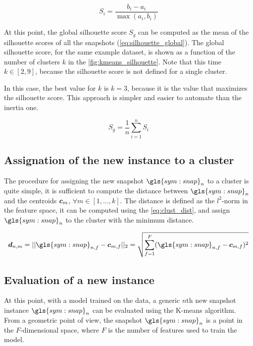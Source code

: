 \begin{equation}
  \label{eq:silhouette}
  S_i = \frac{b_i - a_i}{\max{(a_i,b_i)}}
\end{equation}

At this point, the global silhouette score $S_g$ can be computed as the mean of the silhouette scores of all the snapshots (\autoref{eq:silhouette_global}). The global silhouette score, for the same example dataset, is shown as a function of the number of clusters $k$ in the \autoref{fig:kmeans_silhouette}. Note that this time $k \in [2,9]$, because the silhouette score is not defined for a single cluster.

In this case, the best value for $k$ is $k=3$, because it is the value that maximizes the silhouette score. This approach is simpler and easier to automate than the inertia one. 

\begin{equation}
  \label{eq:silhouette_global}
  S_g = \frac{1}{n}\sum_{i=1}^{n} S_i
\end{equation}

\subsection{Assignation of the new instance to a cluster}
The procedure for assigning the new snapshot $\gls{sym:snap}_n$ to a cluster is quite simple, it is sufficient to compute the distance between $\gls{sym:snap}_n$ and the centroids $\bm{c}_m$, $\forall m \in  [1, \dots , k]$. The distance is defined as the $l^2$-norm in the feature space, it can be computed using the \autoref{eq:clust_dist}, and assign $\gls{sym:snap}_n$ to the cluster with the minimum distance.

\begin{equation}
  \label{eq:clust_dist}
  \vect{d}_{n,m} = ||\gls{sym:snap}_{n,f} - \vect{c}_{m,f}||_2 = \sqrt{\sum_{f=1}^{F} (\gls{sym:snap}_{n,f} - \vect{c}_{m,f})^2}
\end{equation}

\subsection{Evaluation of a new instance}

At this point, with a model trained on the data, a generic $n$th new snapshot instance $\gls{sym:snap}_n$ can be evaluated using the K-means algorithm.
From a geometric point of view, the snapshot $\gls{sym:snap}_n$ is a point in the ${F}$-dimensional space, where ${F}$ is the number of features used to train the model.

